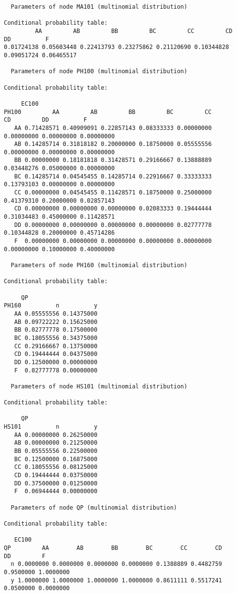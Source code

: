 \documentclass[
]{article}
\begin{document}
\begin{verbatim}
  Parameters of node MA101 (multinomial distribution)

Conditional probability table:
         AA         AB         BB         BC         CC         CD         DD          F 
0.01724138 0.05603448 0.22413793 0.23275862 0.21120690 0.10344828 0.09051724 0.06465517 

  Parameters of node PH100 (multinomial distribution)

Conditional probability table:
 
     EC100
PH100         AA         AB         BB         BC         CC         CD         DD          F
   AA 0.71428571 0.40909091 0.22857143 0.08333333 0.00000000 0.00000000 0.00000000 0.00000000
   AB 0.14285714 0.31818182 0.20000000 0.18750000 0.05555556 0.00000000 0.00000000 0.00000000
   BB 0.00000000 0.18181818 0.31428571 0.29166667 0.13888889 0.03448276 0.05000000 0.00000000
   BC 0.14285714 0.04545455 0.14285714 0.22916667 0.33333333 0.13793103 0.00000000 0.00000000
   CC 0.00000000 0.04545455 0.11428571 0.18750000 0.25000000 0.41379310 0.20000000 0.02857143
   CD 0.00000000 0.00000000 0.00000000 0.02083333 0.19444444 0.31034483 0.45000000 0.11428571
   DD 0.00000000 0.00000000 0.00000000 0.00000000 0.02777778 0.10344828 0.20000000 0.45714286
   F  0.00000000 0.00000000 0.00000000 0.00000000 0.00000000 0.00000000 0.10000000 0.40000000

  Parameters of node PH160 (multinomial distribution)

Conditional probability table:
 
     QP
PH160          n          y
   AA 0.05555556 0.14375000
   AB 0.09722222 0.15625000
   BB 0.02777778 0.17500000
   BC 0.18055556 0.34375000
   CC 0.29166667 0.13750000
   CD 0.19444444 0.04375000
   DD 0.12500000 0.00000000
   F  0.02777778 0.00000000

  Parameters of node HS101 (multinomial distribution)

Conditional probability table:
 
     QP
HS101          n          y
   AA 0.00000000 0.26250000
   AB 0.00000000 0.21250000
   BB 0.05555556 0.22500000
   BC 0.12500000 0.16875000
   CC 0.18055556 0.08125000
   CD 0.19444444 0.03750000
   DD 0.37500000 0.01250000
   F  0.06944444 0.00000000

  Parameters of node QP (multinomial distribution)

Conditional probability table:
 
   EC100
QP         AA        AB        BB        BC        CC        CD        DD         F
  n 0.0000000 0.0000000 0.0000000 0.0000000 0.1388889 0.4482759 0.9500000 1.0000000
  y 1.0000000 1.0000000 1.0000000 1.0000000 0.8611111 0.5517241 0.0500000 0.0000000
\end{verbatim}
\end{document}
